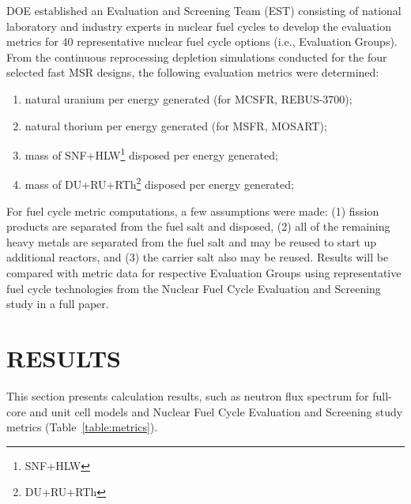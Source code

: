 \documentclass[letterpaper]{mandc2019}
\begin{document}
DOE established an Evaluation and Screening Team (EST) consisting of national laboratory and industry experts in nuclear fuel cycles to develop the evaluation metrics for 40 representative nuclear fuel cycle options (i.e., Evaluation Groups). From the continuous reprocessing depletion simulations conducted for the four selected fast \gls{MSR} designs, the following evaluation metrics were determined:
\vspace{-0.08in}
\begin{enumerate}
	\item natural uranium per energy generated (for \gls{MCSFR}, REBUS-3700);\vspace{-0.11in}
	\item natural thorium per energy generated (for \gls{MSFR}, \gls{MOSART});\vspace{-0.11in}
	\item mass of SNF+HLW\footnote{\gls{SNF}+\gls{HLW}} disposed per energy generated;\vspace{-0.11in}
	\item mass of DU+RU+RTh\footnote{\gls{DU}+\gls{RU}+\gls{RTh}} disposed per energy  generated;\vspace{-0.08in}
\end{enumerate}
For fuel cycle metric computations, a few assumptions were made:
(1) fission products are separated from the fuel salt and disposed,
(2) all of the remaining heavy metals are separated from the fuel salt and may be reused to start up additional reactors, and
(3) the carrier salt also may be reused.
Results will be compared with metric data for respective Evaluation Groups using representative fuel cycle technologies from the Nuclear Fuel Cycle Evaluation and Screening study \cite{wigeland_nuclear_2014-4} in a full paper.

\section{RESULTS}
This section presents calculation results, such as neutron flux spectrum for full-core and unit cell models and Nuclear Fuel Cycle Evaluation and Screening study metrics (Table~\ref{table:metrics}).
\end{document}

